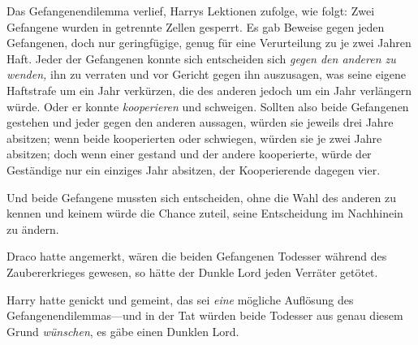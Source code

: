 Das Gefangenendilemma verlief, Harrys Lektionen zufolge, wie folgt: Zwei Gefangene wurden in getrennte Zellen gesperrt. Es gab Beweise gegen jeden Gefangenen, doch nur geringfügige, genug für eine Verurteilung zu je zwei Jahren Haft. Jeder der Gefangenen konnte sich entscheiden sich \emph{gegen den anderen zu wenden,} ihn zu verraten und vor Gericht gegen ihn auszusagen, was seine eigene Haftstrafe um ein Jahr verkürzen, die des anderen jedoch um ein Jahr verlängern würde. Oder er konnte \emph{kooperieren} und schweigen. Sollten also beide Gefangenen gestehen und jeder gegen den anderen aussagen, würden sie jeweils drei Jahre absitzen; wenn beide kooperierten oder schwiegen, würden sie je zwei Jahre absitzen; doch wenn einer gestand und der andere kooperierte, würde der Geständige nur ein einziges Jahr absitzen, der Kooperierende dagegen vier.

Und beide Gefangene mussten sich entscheiden, ohne die Wahl des anderen zu kennen und keinem würde die Chance zuteil, seine Entscheidung im Nachhinein zu ändern.

Draco hatte angemerkt, wären die beiden Gefangenen Todesser während des Zaubererkrieges gewesen, so hätte der Dunkle Lord jeden Verräter getötet.

Harry hatte genickt und gemeint, das sei \emph{eine} mögliche Auflösung des Gefangenendilemmas—und in der Tat würden beide Todesser aus genau diesem Grund \emph{wünschen}, es gäbe einen Dunklen Lord.

